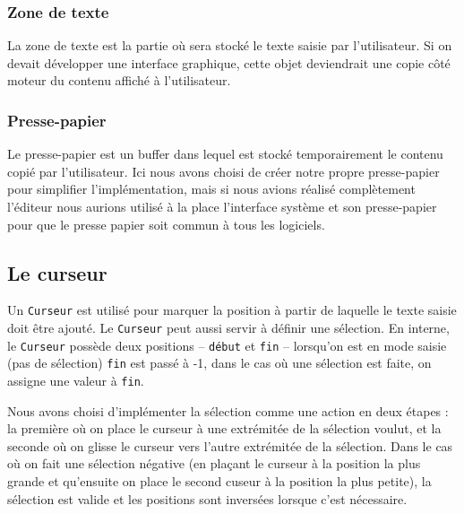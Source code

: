 \documentclass[french]{article}
\begin{document}
\subsubsection{Zone de texte}

La zone de texte est la partie où sera stocké le texte saisie par l'utilisateur. Si on devait développer une interface graphique, cette objet deviendrait une copie côté moteur du contenu affiché à l'utilisateur.

\subsubsection{Presse-papier}

Le presse-papier est un buffer dans lequel est stocké temporairement le contenu copié par l'utilisateur. Ici nous avons choisi de créer notre propre presse-papier pour simplifier l'implémentation, mais si nous avions réalisé complètement l'éditeur nous aurions utilisé à la place l'interface système et son presse-papier pour que le presse papier soit commun à tous les logiciels.

\subsection{Le curseur}\label{ssec:curseur}
Un \texttt{Curseur} est utilisé pour marquer la position à partir de laquelle le texte saisie doit être ajouté. Le \texttt{Curseur} peut aussi servir à définir une sélection. En interne, le \texttt{Curseur} possède deux positions -- \texttt{début} et \texttt{fin} -- lorsqu'on est en \og{}mode saisie\fg{} (pas de sélection) \texttt{fin} est passé à -1, dans le cas où une sélection est faite, on assigne une valeur à \texttt{fin}.

Nous avons choisi d'implémenter la sélection comme une action en deux étapes : la première où on place le curseur à une extrémitée de la sélection voulut, et la seconde où on glisse le curseur vers l'autre extrémitée de la sélection. Dans le cas où on fait une sélection \og{}négative\fg{} (en plaçant le curseur à la position la plus grande et qu'ensuite on place le second cuseur à la position la plus petite), la sélection est valide et les positions sont inversées lorsque c'est nécessaire.
\end{document}
